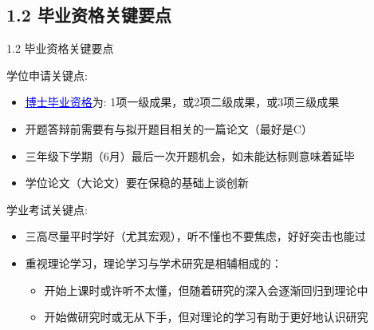 \documentclass[10pt,aspectratio=43,mathserif,table]{beamer}
\begin{document}
\subsection{1.2 毕业资格关键要点}
\begin{frame}{\small 1.2 毕业资格关键要点}
	\begin{block}{\footnotesize 学位申请关键点:}
		 \begin{itemize}
		 	\item \footnotesize \href{https://law.uibe.edu.cn/docs/2022-07/297b8754a81b460ea4cffecce1d491f4.pdf}{\textcolor{blue}{\underline{博士毕业资格}}}为: 1项一级成果，或2项二级成果，或3项三级成果
		 \end{itemize}
		 
		 \begin{itemize}
		 	\item \footnotesize 开题答辩前需要有与拟开题目相关的一篇论文（最好是C）
		 \end{itemize}
		 
		 \begin{itemize}
		 	\item \footnotesize 三年级下学期（6月）最后一次开题机会，如未能达标则意味着延毕
		 \end{itemize}
		 
		 \begin{itemize}
		 	\item \footnotesize 学位论文（大论文）要在保稳的基础上谈创新
		 \end{itemize}
	\end{block}
		
	
	\begin{block}{\footnotesize 学业考试关键点:}
		
		\begin{itemize}
			\item \footnotesize 三高尽量平时学好（尤其宏观），听不懂也不要焦虑，好好突击也能过
		\end{itemize}
		
		
		\begin{itemize}
			\item \footnotesize 重视理论学习，理论学习与学术研究是相辅相成的：
			\begin{itemize}
				\item \footnotesize 开始上课时或许听不太懂，但随着研究的深入会逐渐回归到理论中
			\end{itemize}
			\begin{itemize}
				\item \footnotesize 开始做研究时或无从下手，但对理论的学习有助于更好地认识研究
			\end{itemize}
		\end{itemize}
		

\end{block}
\end{frame}
\end{document}
